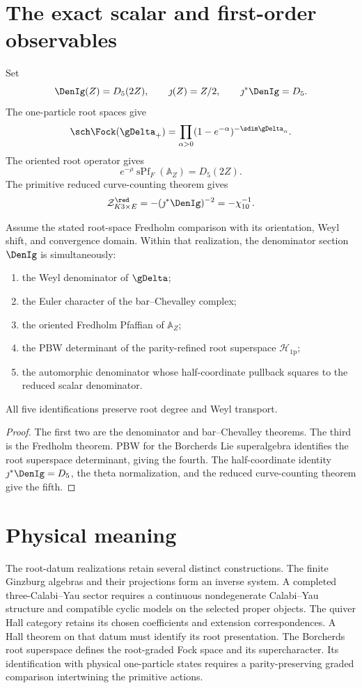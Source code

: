 \chapter{The exact scalar and first-order observables}
Set
\[
 \DenIg(Z)=D_5(2Z),
 \qquad \jmath(Z)=Z/2,
 \qquad \jmath^*\DenIg=D_5.
\]
The one-particle root spaces give
\[
 \sch\Fock(\gDelta_+)
 =\prod_{\alpha>0}(1-e^{-\alpha})^{-\sdim\gDelta_\alpha}.
\]
The oriented root operator gives
\[
 e^{-\rho}\operatorname{sPf}_F(\mathbb A_Z)=D_5(2Z).
\]
The primitive reduced curve-counting theorem gives
\[
 \mathcal Z^{\red}_{K3\times E}=-(\jmath^*\DenIg)^{-2}=-\chi_{10}^{-1}.
\]

\begin{theorem}
Assume the stated root-space Fredholm comparison with its orientation,
Weyl shift, and convergence domain.
Within that realization, the denominator section $\DenIg$ is simultaneously:
\begin{enumerate}
\item the Weyl denominator of $\gDelta$;
\item the Euler character of the bar--Chevalley complex;
\item the oriented Fredholm Pfaffian of $\mathbb A_Z$;
\item the PBW determinant of the parity-refined root superspace $\mathcal H_{\mathrm{1p}}$;
\item the automorphic denominator whose half-coordinate pullback squares to the reduced scalar denominator.
\end{enumerate}
All five identifications preserve root degree and Weyl transport.
\end{theorem}
\begin{proof}
The first two are the denominator and bar--Chevalley theorems.  The third is the Fredholm theorem.  PBW for the Borcherds Lie superalgebra identifies the root superspace determinant, giving the fourth.  The half-coordinate identity $\jmath^*\DenIg=D_5$, the theta normalization, and the reduced curve-counting theorem give the fifth.
\end{proof}

\chapter{Physical meaning}
The root-datum realizations retain several distinct constructions.
The finite Ginzburg algebras and their projections form an inverse system.
A completed three-Calabi--Yau sector requires a continuous nondegenerate
Calabi--Yau structure and compatible cyclic models on the selected proper objects.
The quiver Hall category retains its chosen coefficients and extension
correspondences. A Hall theorem on that datum must identify its root presentation.
The Borcherds root superspace defines the root-graded Fock space and its
supercharacter. Its identification with physical one-particle states
requires a parity-preserving graded comparison intertwining the primitive actions.

